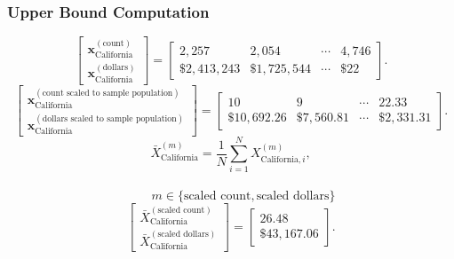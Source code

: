 \subsubsection{Upper Bound Computation}
\[
\begin{bmatrix}
\mathbf{x}_{\text{California}}^{(\text{count})}\\
\mathbf{x}_{\text{California}}^{(\text{dollars})}
\end{bmatrix}
=
\begin{bmatrix}
2{,}257 & 2{,}054 & \cdots & 4{,}746\\
\$2{,}413{,}243 & \$1{,}725{,}544 & \cdots & \$22
\end{bmatrix}.
\]
\[
\begin{bmatrix}
\mathbf{x}_{\text{California}}^{(\text{count scaled to sample population})}\\
\mathbf{x}_{\text{California}}^{(\text{dollars scaled to sample population})}
\end{bmatrix}
=
\begin{bmatrix}
10 & 9 & \cdots & 22.33\\
\$10{,}692.26 & \$7{,}560.81 & \cdots & \$2{,}331.31
\end{bmatrix}.
\]
\[
\bar{X}_{\text{California}}^{(m)}
= \frac{1}{N}\sum_{i=1}^{N} X_{\text{California},i}^{(m)},
\]
\\
\[
\qquad
m \in \{\text{scaled count},\text{scaled dollars}\}
\]
\[
\begin{bmatrix}
\bar{X}_{\text{California}}^{(\text{scaled count})}\\
\bar{X}_{\text{California}}^{(\text{scaled dollars})}
\end{bmatrix}
=
\begin{bmatrix}
26.48\\
\$43{,}167.06
\end{bmatrix}.
\]
